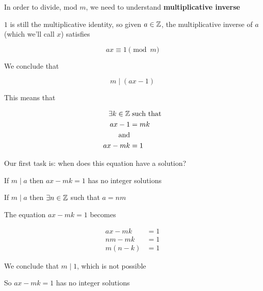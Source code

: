 \documentclass[../../Main.tex]{subfiles}
\begin{document}
In order to divide, mod $m$, we need to understand \textbf{multiplicative inverse}

$1$ is still the multiplicative identity, so given $a \in \mathbb{Z}$, the multiplicative inverse of $a$ (which we'll call $x$) satisfies

$$ax \equiv 1 \pmod{m}$$

We conclude that

$$m \mid (ax - 1)$$

This means that 

\begin{align*}
    \exists k \in \mathbb{Z} &\; \text{such that} \\
    ax - 1 &= mk \\
    \text{and} \\
    ax - mk &= 1
\end{align*}

Our first task is: when does this equation have a solution?

\begin{claim}
    If $m \mid a$ then $ax - mk = 1$ has no integer solutions
\end{claim}

\begin{poof}
    If $m \mid a$ then $\exists n \in \mathbb{Z}$ such that $a = nm$

    The equation $ax - mk = 1$ becomes

    \begin{align*}
        ax - mk &= 1 \\
        nm - mk &= 1 \tag{Substitute} \\
        m(n - k) &= 1 \tag{Factor m}
    \end{align*}

    We conclude that $m \mid 1$, which is not possible

    So $ax - mk = 1$ has no integer solutions
\end{poof}
\end{document}

